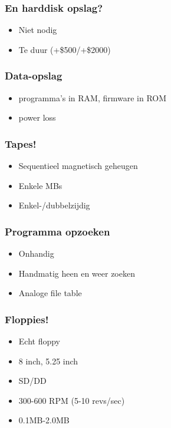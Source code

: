\documentclass[aspectratio=43]{uva-inf-presentation}
\begin{document}

\begin{frame}
\frametitle{En harddisk opslag?}

\begin{itemize}
\item Niet nodig
\item Te duur (+\$500/+\$2000)
\end{itemize}

\end{frame}


\begin{frame}
\frametitle{Data-opslag}

\begin{itemize}
\item programma's in RAM, firmware in ROM
\item power loss
\end{itemize}

\end{frame}


\begin{frame}
\frametitle{Tapes!}

\begin{itemize}
\item Sequentieel magnetisch geheugen
\item Enkele MBs
\item Enkel-/dubbelzijdig
\end{itemize}

\end{frame}


\begin{frame}
\frametitle{Programma opzoeken}

\begin{itemize}
\item Onhandig
\item Handmatig heen en weer zoeken
\item Analoge file table
\end{itemize}

\end{frame}


\begin{frame}
\frametitle{Floppies!}

\begin{itemize}
\item Echt floppy
\item 8 inch, 5.25 inch
\item SD/DD
\item 300-600 RPM (5-10 revs/sec)
\item 0.1MB-2.0MB
\end{itemize}

\end{frame}
\end{document}

